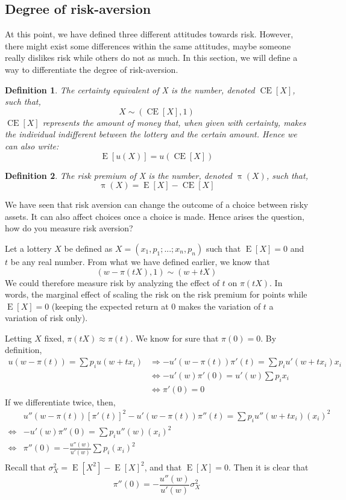 \documentclass[12pt]{report}
\newtheorem{definition}{Definition}[chapter]
\newcommand{\E}[1]{\operatorname{E}\left[#1\right]}
\begin{document}
\subsection{Degree of risk-aversion}

At this point, we have defined three different attitudes towards risk. However, there might exist some differences within the same attitudes, maybe someone really dislikes risk while others do not as much. In this section, we will define a way to differentiate the degree of risk-aversion.

\begin{definition}
The certainty equivalent of X is the number, denoted $\operatorname{CE}[X]$, such that, $$X\sim (\operatorname{CE}[X], 1)$$ $\operatorname{CE}[X]$ represents the amount of money that, when given with certainty, makes the individual indifferent between the lottery and the certain amount. Hence we can also write: $$\E{u(X)} = u(\operatorname{CE}[X]) $$
\end{definition}

\begin{definition}
The risk premium of X is the number, denoted $\operatorname{\pi}(X)$, such that, $$\operatorname{\pi}(X) = \E{X} - \operatorname{CE}[X]$$
\end{definition}

We have seen that risk aversion can change the outcome of a choice between risky assets. It can also affect choices once a choice is made. Hence arises the question, how do you measure risk aversion?

Let a lottery $X$ be defined as $X = (x_1,p_1; ...; x_n,p_n)$ such that $\E{X} = 0$ and $t$ be any real number. From what we have defined earlier, we know that $$(w - \pi(tX),1) \sim (w+tX)$$ We could therefore measure risk by analyzing the effect of $t$ on $\pi(tX)$. In words, the marginal effect of scaling the risk on the risk premium for points while $\E{X}=0$ (keeping the expected return at $0$ makes the variation of $t$ a variation of risk only).

Letting $X$ fixed, $\pi(tX) \approx \pi(t)$. We know for sure that $\pi(0) = 0$. By definition,\begin{align*}
u(w - \pi(t)) = \sum p_iu(w+tx_i) &\Rightarrow -u'(w-\pi(t))\pi'(t) = \sum p_iu'(w+tx_i)x_i \\ & \Leftrightarrow -u'(w)\pi'(0) = u'(w)\sum p_ix_i \\ & \Leftrightarrow \pi'(0) = 0
\end{align*}
If we differentiate twice, then,\begin{align*}
& u''(w-\pi(t))[\pi'(t)]^2 - u'(w-\pi(t))\pi''(t)  = \sum p_iu''(w+tx_i)(x_i)^2 \\ \Leftrightarrow & - u'(w)\pi''(0)  = \sum p_iu''(w)(x_i)^2 \\\Leftrightarrow & \pi''(0)  = -\frac{u''(w)}{ u'(w)} \sum p_i(x_i)^2 \\
\end{align*}
Recall that $\sigma_X^2 = \E{X^2} - \E{X}^2$, and that $\E{X} =0$. Then it is clear that $$\pi''(0)  = -\frac{u''(w)}{ u'(w)} \sigma_X^2$$
\end{document}
